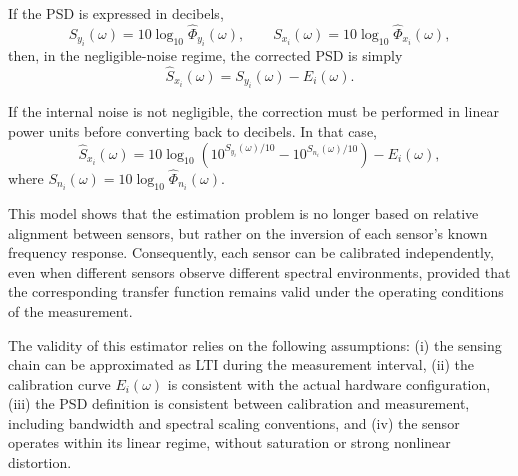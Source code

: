 \documentclass[11pt]{article}
\begin{document}
If the PSD is expressed in decibels,
\[
S_{y_i}(\omega)=10\log_{10}\widehat{\Phi}_{y_i}(\omega),
\qquad
S_{x_i}(\omega)=10\log_{10}\widehat{\Phi}_{x_i}(\omega),
\]
then, in the negligible-noise regime, the corrected PSD is simply
\[
\widehat{S}_{x_i}(\omega)=S_{y_i}(\omega)-E_i(\omega).
\]

If the internal noise is not negligible, the correction must be performed in linear power units before converting back to decibels. In that case,
\[
\widehat{S}_{x_i}(\omega)
=
10\log_{10}
\left(
10^{S_{y_i}(\omega)/10}
-
10^{S_{n_i}(\omega)/10}
\right)
-
E_i(\omega),
\]
where $S_{n_i}(\omega)=10\log_{10}\widehat{\Phi}_{n_i}(\omega)$.

This model shows that the estimation problem is no longer based on relative alignment between sensors, but rather on the inversion of each sensor's known frequency response. Consequently, each sensor can be calibrated independently, even when different sensors observe different spectral environments, provided that the corresponding transfer function remains valid under the operating conditions of the measurement.

The validity of this estimator relies on the following assumptions: (i) the sensing chain can be approximated as LTI during the measurement interval, (ii) the calibration curve $E_i(\omega)$ is consistent with the actual hardware configuration, (iii) the PSD definition is consistent between calibration and measurement, including bandwidth and spectral scaling conventions, and (iv) the sensor operates within its linear regime, without saturation or strong nonlinear distortion.
\end{document}
